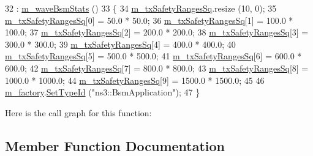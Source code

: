 \begin{DoxyCode}
32   : \hyperlink{classns3_1_1WaveBsmHelper_a5402fdf10496407bc439622b7698e4f7}{m\_waveBsmStats} ()
33 \{
34   \hyperlink{classns3_1_1WaveBsmHelper_a44eb2f603f58383dadc9b41eae68d5c9}{m\_txSafetyRangesSq}.resize (10, 0);
35   \hyperlink{classns3_1_1WaveBsmHelper_a44eb2f603f58383dadc9b41eae68d5c9}{m\_txSafetyRangesSq}[0] = 50.0 * 50.0;
36   \hyperlink{classns3_1_1WaveBsmHelper_a44eb2f603f58383dadc9b41eae68d5c9}{m\_txSafetyRangesSq}[1] = 100.0 * 100.0;
37   \hyperlink{classns3_1_1WaveBsmHelper_a44eb2f603f58383dadc9b41eae68d5c9}{m\_txSafetyRangesSq}[2] = 200.0 * 200.0;
38   \hyperlink{classns3_1_1WaveBsmHelper_a44eb2f603f58383dadc9b41eae68d5c9}{m\_txSafetyRangesSq}[3] = 300.0 * 300.0;
39   \hyperlink{classns3_1_1WaveBsmHelper_a44eb2f603f58383dadc9b41eae68d5c9}{m\_txSafetyRangesSq}[4] = 400.0 * 400.0;
40   \hyperlink{classns3_1_1WaveBsmHelper_a44eb2f603f58383dadc9b41eae68d5c9}{m\_txSafetyRangesSq}[5] = 500.0 * 500.0;
41   \hyperlink{classns3_1_1WaveBsmHelper_a44eb2f603f58383dadc9b41eae68d5c9}{m\_txSafetyRangesSq}[6] = 600.0 * 600.0;
42   \hyperlink{classns3_1_1WaveBsmHelper_a44eb2f603f58383dadc9b41eae68d5c9}{m\_txSafetyRangesSq}[7] = 800.0 * 800.0;
43   \hyperlink{classns3_1_1WaveBsmHelper_a44eb2f603f58383dadc9b41eae68d5c9}{m\_txSafetyRangesSq}[8] = 1000.0 * 1000.0;
44   \hyperlink{classns3_1_1WaveBsmHelper_a44eb2f603f58383dadc9b41eae68d5c9}{m\_txSafetyRangesSq}[9] = 1500.0 * 1500.0;
45 
46   \hyperlink{classns3_1_1WaveBsmHelper_a78e835f63e7c901a062d6d3f33cdcd50}{m\_factory}.\hyperlink{classns3_1_1ObjectFactory_a77dcd099064038a1eb7a6b8251229ec3}{SetTypeId} (\textcolor{stringliteral}{"ns3::BsmApplication"});
47 \}
\end{DoxyCode}


Here is the call graph for this function\+:




\subsection{Member Function Documentation}

